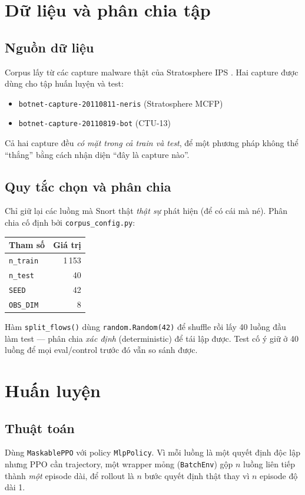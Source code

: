 \documentclass[12pt,a4paper]{report}
\begin{document}
\section{Dữ liệu và phân chia tập}

\subsection{Nguồn dữ liệu}
Corpus lấy từ các capture malware thật của Stratosphere IPS
\citep{stratosphere_ctu13}. Hai capture được dùng cho tập huấn luyện và test:
\begin{itemize}
  \item \texttt{botnet-capture-20110811-neris} (Stratosphere MCFP)
  \item \texttt{botnet-capture-20110819-bot} (CTU-13)
\end{itemize}
Cả hai capture đều \emph{có mặt trong cả train và test}, để một phương pháp không thể
``thắng'' bằng cách nhận diện ``đây là capture nào''.

\subsection{Quy tắc chọn và phân chia}
Chỉ giữ lại các luồng mà Snort thật \emph{thật sự} phát hiện (để có cái mà né).
Phân chia cố định bởi \texttt{corpus\_config.py}:
\begin{center}
\begin{tabular}{lr}
\toprule
Tham số & Giá trị \\
\midrule
\texttt{n\_train} & 1\,153 \\
\texttt{n\_test}  & 40 \\
\texttt{SEED}     & 42 \\
\texttt{OBS\_DIM} & 8 \\
\bottomrule
\end{tabular}
\end{center}
Hàm \texttt{split\_flows()} dùng \texttt{random.Random(42)} để shuffle rồi lấy 40 luồng
đầu làm test — phân chia \emph{xác định} (deterministic) để tái lập được. Test cố ý
giữ ở 40 luồng để mọi eval/control trước đó vẫn so sánh được.

\section{Huấn luyện}

\subsection{Thuật toán}
Dùng \texttt{MaskablePPO} \citep{schulman2017proximal,stable_baselines3} với policy
\texttt{MlpPolicy}. Vì mỗi luồng là một quyết định độc lập nhưng PPO cần trajectory,
một wrapper mỏng (\texttt{BatchEnv}) gộp $n$ luồng liên tiếp thành \emph{một} episode
dài, để rollout là $n$ bước quyết định thật thay vì $n$ episode độ dài 1.
\end{document}
